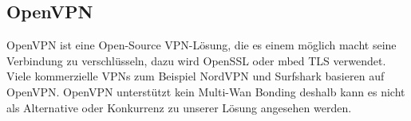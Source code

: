 \subsection{OpenVPN}
OpenVPN ist eine Open-Source VPN-Lösung, die es einem möglich macht seine Verbindung zu verschlüsseln, dazu wird OpenSSL oder mbed TLS verwendet. Viele kommerzielle VPNs zum Beispiel NordVPN und Surfshark basieren auf OpenVPN.
\newline
\newline
OpenVPN unterstützt kein Multi-Wan Bonding deshalb kann es nicht als Alternative oder Konkurrenz zu unserer Lösung angesehen werden.
